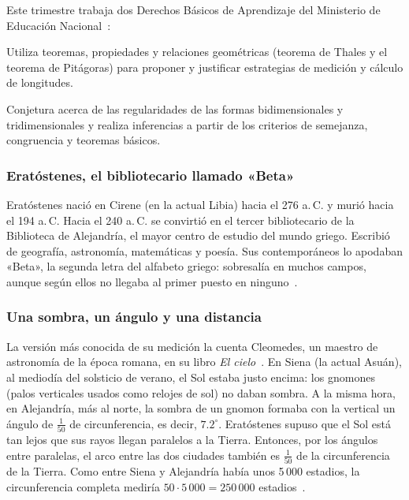 \documentclass[11pt]{article}
\begin{document}
Este trimestre trabaja dos Derechos Básicos de Aprendizaje del Ministerio de
Educación Nacional~\cite{mendba}:

\begin{dba}
Utiliza teoremas, propiedades y relaciones geométricas (teorema de Thales y el
teorema de Pitágoras) para proponer y justificar estrategias de medición y cálculo
de longitudes.
\end{dba}

\begin{dba}
Conjetura acerca de las regularidades de las formas bidimensionales y
tridimensionales y realiza inferencias a partir de los criterios de semejanza,
congruencia y teoremas básicos.
\end{dba}


\subsubsection*{Eratóstenes, el bibliotecario llamado «Beta»}

Eratóstenes nació en Cirene (en la actual Libia) hacia el 276 a.\,C. y murió hacia
el 194 a.\,C. Hacia el 240 a.\,C. se convirtió en el tercer bibliotecario de la
Biblioteca de Alejandría, el mayor centro de estudio del mundo griego. Escribió de
geografía, astronomía, matemáticas y poesía. Sus contemporáneos lo apodaban
«Beta», la segunda letra del alfabeto griego: sobresalía en muchos campos, aunque
según ellos no llegaba al primer puesto en ninguno~\cite{mactutoreratostenes}.

\subsubsection*{Una sombra, un ángulo y una distancia}

La versión más conocida de su medición la cuenta Cleomedes, un maestro de
astronomía de la época romana, en su libro \emph{El cielo}~\cite{cleomedes}. En
Siena (la actual Asuán), al mediodía del solsticio de verano, el Sol estaba justo
encima: los gnomones (palos verticales usados como relojes de sol) no daban
sombra. A la misma hora, en Alejandría, más al norte, la sombra de un gnomon
formaba con la vertical un ángulo de $\frac{1}{50}$ de circunferencia, es decir,
$\num{7,2}^\circ$. Eratóstenes supuso que el Sol está tan lejos que sus rayos llegan
paralelos a la Tierra. Entonces, por los ángulos entre paralelas, el arco entre las
dos ciudades también es $\frac{1}{50}$ de la circunferencia de la Tierra. Como entre
Siena y Alejandría había unos 5\,000 estadios, la circunferencia completa mediría
$50 \cdot 5\,000 = 250\,000$ estadios~\cite{cleomedes, mactutoreratostenes}.
\end{document}
